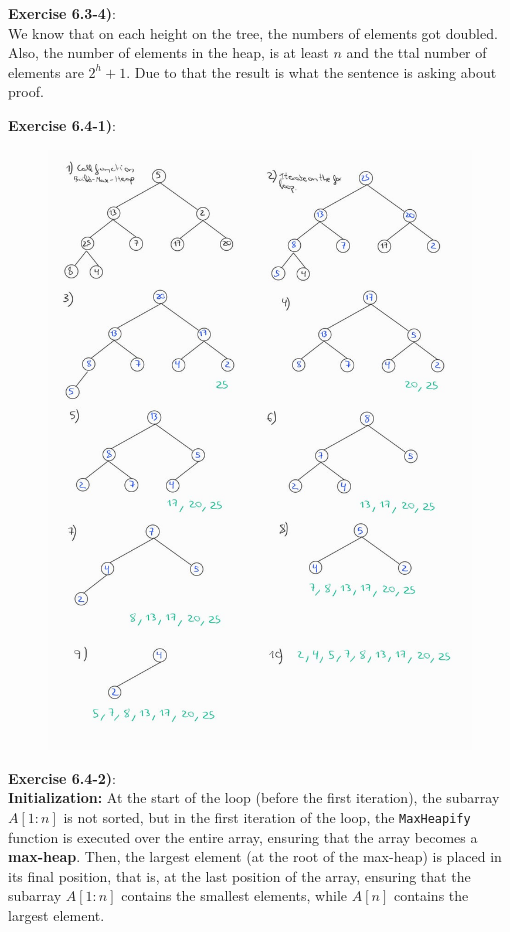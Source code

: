 \documentclass{article}
\newcounter{exercise}[section]   %
\begin{document}
\textbf{Exercise 6.3-4)}:\\
We know that on each height on the tree, the numbers of elements got doubled. Also, the
number of elements in the heap, is at least \(n\) and the ttal number of elements are
\(2^h + 1\). Due to that the result is what the sentence is asking about proof.

\textbf{Exercise 6.4-1)}:
\begin{figure}[h]
    \centering
    \includegraphics[scale=0.32]{Problem6_4_1.jpeg}
\end{figure}
\newpage

\textbf{Exercise 6.4-2)}:\\
\textbf{Initialization:} At the start of the loop (before the first iteration), the
subarray \( A[1:n] \) is not sorted, but in the first iteration of the loop, the
\texttt{MaxHeapify} function is executed over the entire array, ensuring that the
array becomes a \textbf{max-heap}. Then, the largest element (at the root of the max-heap)
is placed in its final position, that is, at the last position of the array, ensuring
that the subarray \( A[1:n] \) contains the smallest elements, while \( A[n] \) contains
the largest element.
\end{document}
